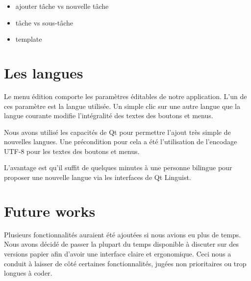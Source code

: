 \documentclass[11pt]{article}
\begin{document}
\begin{itemize}
\item ajouter tâche vs nouvelle tâche
\item tâche vs sous-tâche
\item template
\end{itemize}


\section{Les langues}

Le menu édition comporte les paramètres éditables de notre
application. L'un de ces paramètre est la langue utilisée. Un simple
clic sur une autre langue que la langue courante modifie l'intégralité
des textes des boutons et menus.

Nous avons utilisé les capacités de Qt pour permettre l'ajout très
simple de nouvelles langues. Une précondition pour cela a été
l'utilisation de l'encodage UTF-8 pour les textes des boutons et
menus.

L'avantage est qu'il suffit de quelques minutes à une personne
bilingue pour proposer une nouvelle langue via les interfaces de Qt
Linguist.


\section{Future works}
\label{sec:futureWorks}

Plusieurs fonctionnalités auraient été ajoutées si nous avions eu plus
de temps. Nous avons décidé de passer la plupart du temps disponible à
discuter sur des versions papier afin d'avoir une interface claire et
ergonomique. Ceci nous a conduit à laisser de côté certaines
fonctionnalités, jugées non prioritaires ou trop longues à
coder.
\end{document}
